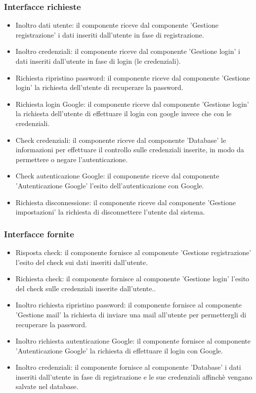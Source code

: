 \documentclass[a4paper,12pt]{article}
\begin{document}
\subsubsection*{Interfacce richieste}
\begin{itemize} \setlength\itemsep{0.01em}
\item {\sffamily Inoltro dati utente}: il componente riceve dal componente 'Gestione registrazione' i dati inseriti dall'utente in fase di registrazione.
\item {\sffamily Inoltro credenziali}: il componente riceve dal componente 'Gestione login' i dati inseriti dall'utente in fase di login (le credenziali).
\item {\sffamily Richiesta ripristino password}: il componente riceve dal componente 'Gestione login' la richiesta dell'utente di recuperare la password.
\item {\sffamily Richiesta login Google}: il componente riceve dal componente 'Gestione login' la richiesta dell'utente di effettuare il login con google invece che con le credenziali.
\item {\sffamily Check credenziali}: il componente riceve dal componente 'Database' le informazioni per effettuare il controllo sulle credenziali inserite, in modo da permettere o negare l'autenticazione.
\item {\sffamily Check autenticazione Google}: il componente riceve dal componente 'Autenticazione Google' l'esito dell'autenticazione con Google.
\item {\sffamily Richiesta disconnessione}: il componente riceve dal componente 'Gestione impostazioni' la richiesta di disconnettere l'utente dal sistema.
\end{itemize}

\subsubsection*{Interfacce fornite}
\begin{itemize} \setlength\itemsep{0.01em}
\item {\sffamily Risposta check}: il componente fornisce al componente 'Gestione registrazione' l'esito del check sui dati inseriti dall'utente.
\item {\sffamily Richiesta check}:  il componente fornisce al componente 'Gestione login' l'esito del check sulle credenziali inserite dall'utente..
\item {\sffamily Inoltro richiesta ripristino password}: il componente fornisce al componente 'Gestione mail' la richiesta di inviare una mail all'utente per permettergli di recuperare la password.
\item {\sffamily Inoltro richiesta autenticazione Google}: il componente fornisce al componente 'Autenticazione Google' la richiesta di effettuare il login con Google.
\item {\sffamily Inoltro credenziali}: il componente fornisce al componente 'Database' i dati inseriti dall'utente in fase di registrazione e le sue credenziali affinchè vengano salvate nel database.

\end{itemize}
\end{document}
